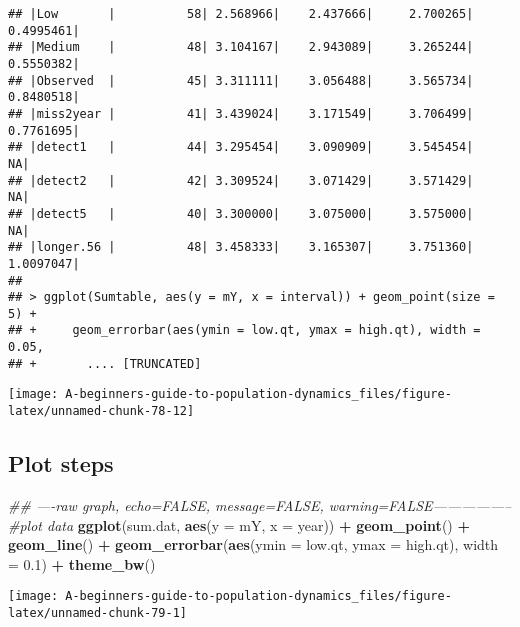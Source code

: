 \documentclass[]{book}
\newenvironment{Shaded}{\begin{snugshade}}{\end{snugshade}}
\newcommand{\CommentTok}[1]{\textcolor[rgb]{0.56,0.35,0.01}{\textit{#1}}}
\newcommand{\DataTypeTok}[1]{\textcolor[rgb]{0.13,0.29,0.53}{#1}}
\newcommand{\FloatTok}[1]{\textcolor[rgb]{0.00,0.00,0.81}{#1}}
\newcommand{\KeywordTok}[1]{\textcolor[rgb]{0.13,0.29,0.53}{\textbf{#1}}}
\newcommand{\NormalTok}[1]{#1}
\newcommand{\OperatorTok}[1]{\textcolor[rgb]{0.81,0.36,0.00}{\textbf{#1}}}
\newcommand{\StringTok}[1]{\textcolor[rgb]{0.31,0.60,0.02}{#1}}
\begin{document}
\begin{verbatim}
## |Low       |          58| 2.568966|    2.437666|     2.700265| 0.4995461|
## |Medium    |          48| 3.104167|    2.943089|     3.265244| 0.5550382|
## |Observed  |          45| 3.311111|    3.056488|     3.565734| 0.8480518|
## |miss2year |          41| 3.439024|    3.171549|     3.706499| 0.7761695|
## |detect1   |          44| 3.295454|    3.090909|     3.545454|        NA|
## |detect2   |          42| 3.309524|    3.071429|     3.571429|        NA|
## |detect5   |          40| 3.300000|    3.075000|     3.575000|        NA|
## |longer.56 |          48| 3.458333|    3.165307|     3.751360| 1.0097047|
## 
## > ggplot(Sumtable, aes(y = mY, x = interval)) + geom_point(size = 5) + 
## +     geom_errorbar(aes(ymin = low.qt, ymax = high.qt), width = 0.05, 
## +       .... [TRUNCATED]
\end{verbatim}

\begin{center}\texttt{[image: A-beginners-guide-to-population-dynamics\_files/figure-latex/unnamed-chunk-78-12]} \end{center}

\hypertarget{plot-steps}{%
\subsection{Plot steps}\label{plot-steps}}

\begin{Shaded}
\begin{Highlighting}[]
\CommentTok{## ----raw graph, echo=FALSE, message=FALSE, warning=FALSE-----------------}
\CommentTok{#plot data}
\KeywordTok{ggplot}\NormalTok{(sum.dat, }\KeywordTok{aes}\NormalTok{(}\DataTypeTok{y =}\NormalTok{ mY, }\DataTypeTok{x =}\NormalTok{ year)) }\OperatorTok{+}
\StringTok{  }\KeywordTok{geom_point}\NormalTok{() }\OperatorTok{+}
\StringTok{  }\KeywordTok{geom_line}\NormalTok{() }\OperatorTok{+}
\StringTok{  }\KeywordTok{geom_errorbar}\NormalTok{(}\KeywordTok{aes}\NormalTok{(}\DataTypeTok{ymin =}\NormalTok{ low.qt, }\DataTypeTok{ymax =}\NormalTok{ high.qt), }\DataTypeTok{width =} \FloatTok{0.1}\NormalTok{) }\OperatorTok{+}
\StringTok{  }\KeywordTok{theme_bw}\NormalTok{()}
\end{Highlighting}
\end{Shaded}

\begin{center}\texttt{[image: A-beginners-guide-to-population-dynamics\_files/figure-latex/unnamed-chunk-79-1]} \end{center}
\end{document}
